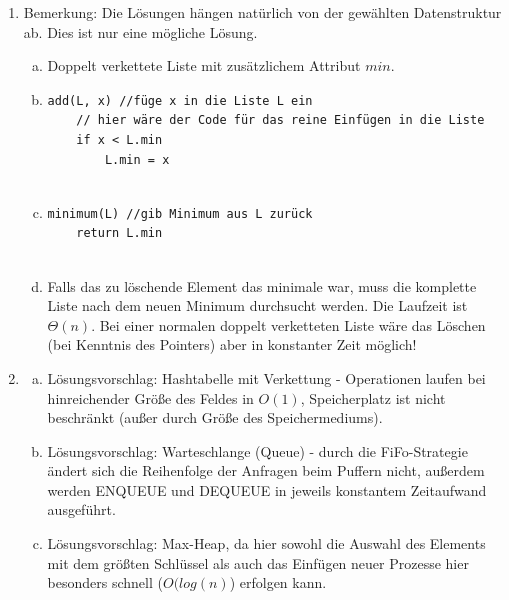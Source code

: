 \documentclass{scrartcl}
\begin{document}
\begin{enumerate}[(1)]
\item Bemerkung: Die L\"osungen h\"angen nat\"urlich von der gew\"ahlten Datenstruktur ab. Dies ist nur eine m\"ogliche L\"osung.
\begin{enumerate}[(a)]
\item Doppelt verkettete Liste mit zus\"atzlichem Attribut $min$.
\item
\begin{verbatim}
add(L, x) //füge x in die Liste L ein
    // hier wäre der Code für das reine Einfügen in die Liste
    if x < L.min
    	L.min = x
    	
\end{verbatim}
\item
\begin{verbatim}
minimum(L) //gib Minimum aus L zurück
    return L.min
    	
\end{verbatim}
\item Falls das zu l\"oschende Element das minimale war, muss die komplette Liste nach dem neuen Minimum durchsucht werden. Die Laufzeit ist $\Theta(n)$. Bei einer normalen doppelt verketteten Liste w\"are das L\"oschen (bei Kenntnis des Pointers) aber in konstanter Zeit m\"oglich!
\end{enumerate}

\item
\begin{enumerate}[(a)]
\item Lösungsvorschlag: Hashtabelle mit Verkettung - Operationen laufen bei hinreichender Größe des Feldes in $O(1)$, Speicherplatz ist nicht beschränkt (außer durch Größe des Speichermediums).
\item Lösungsvorschlag: Warteschlange (Queue) - durch die FiFo-Strategie ändert sich die Reihenfolge der Anfragen beim Puffern nicht, außerdem werden ENQUEUE und DEQUEUE in jeweils konstantem Zeitaufwand ausgeführt.
\item Lösungsvorschlag: Max-Heap, da hier sowohl die Auswahl des Elements mit dem größten Schlüssel als auch das Einfügen neuer Prozesse hier besonders schnell ($O(log(n)$) erfolgen kann. 
\end{enumerate}


\end{enumerate}
\end{document}

